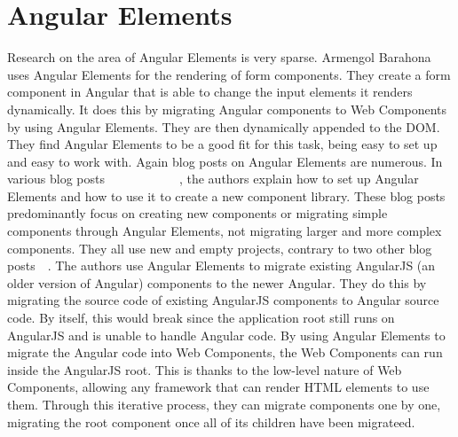 \section{Angular Elements}
Research on the area of Angular Elements is very sparse. Armengol Barahona \etal{}~\cite{armengol2020development} uses Angular Elements for the rendering of form components. They create a form component in Angular that is able to change the input elements it renders dynamically. It does this by migrating Angular components to Web Components by using Angular Elements. They are then dynamically appended to the DOM. They find Angular Elements to be a good fit for this task, being easy to set up and easy to work with.
Again blog posts on Angular Elements are numerous. In various blog posts~~~~~~~~~~~~, the authors explain how to set up Angular Elements and how to use it to create a new component library. These blog posts predominantly focus on creating new components or migrating simple components through Angular Elements, not migrating larger and more complex components. They all use new and empty projects, contrary to two other blog posts~~. The authors use Angular Elements to migrate existing AngularJS (an older version of Angular) components to the newer Angular. They do this by migrating the source code of existing AngularJS components to Angular source code. By itself, this would break since the application root still runs on AngularJS and is unable to handle Angular code. By using Angular Elements to migrate the Angular code into Web Components, the Web Components can run inside the AngularJS root. This is thanks to the low-level nature of Web Components, allowing any framework that can render HTML elements to use them. Through this iterative process, they can migrate components one by one, migrating the root component once all of its children have been migrateed.

